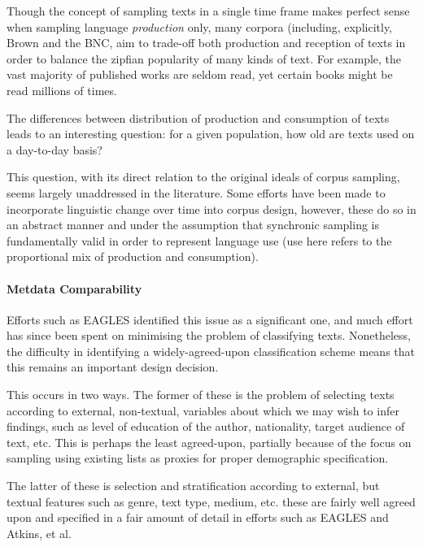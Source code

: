 Though the concept of sampling texts in a single time frame makes perfect sense when sampling language \textit{production} only, many corpora (including, explicitly, Brown and the BNC, aim to trade-off both production and reception of texts in order to balance the zipfian popularity of many kinds of text.  For example, the vast majority of published works are seldom read, yet certain books might be read millions of times.

The differences between distribution of production and consumption of texts leads to an interesting question: for a given population, how old are texts used on a day-to-day basis?

This question, with its direct relation to the original ideals of corpus sampling, seems largely unaddressed in the literature. Some efforts have been made to incorporate linguistic change over time into corpus design, however, these do so in an abstract manner and under the assumption that synchronic sampling is fundamentally valid in order to represent language use (use here refers to the proportional mix of production and consumption).







\paragraph{Metdata Comparability}
Efforts such as EAGLES identified this issue as a significant one, and much effort has since been spent on minimising the problem of classifying texts.  Nonetheless, the difficulty in identifying a widely-agreed-upon classification scheme means that this remains an important design decision.

This occurs in two ways. The former of these is the problem of selecting texts according to external, non-textual, variables about which we may wish to infer findings, such as level of education of the author, nationality, target audience of text, etc. This is perhaps the least agreed-upon, partially because of the focus on sampling using existing lists as proxies for proper demographic specification.

The latter of these is selection and stratification according to external, but textual features such as genre, text type, medium, etc. these are fairly well agreed upon and specified in a fair amount of detail in efforts such as EAGLES and Atkins, et al.  

